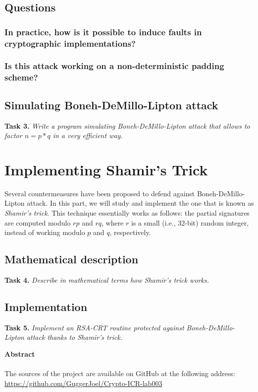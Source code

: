 \documentclass[a4paper]{report}
\begin{document}
\section{Questions}
\subsection{In practice, how is it possible to induce faults in cryptographic implementations?}
\subsection{Is this attack working on a non-deterministic padding scheme?}

\section{Simulating Boneh-DeMillo-Lipton attack}
\textbf{Task 3.} \textit{Write a program simulating Boneh-DeMillo-Lipton attack that allows to factor $n = p*q$ in a very efficient way.}


\chapter{Implementing Shamir’s Trick}
Several countermeasures have been proposed to defend against Boneh-DeMillo-Lipton attack. In this part, we will study and implement the one that is known as \textit{Shamir’s trick}. This technique essentially works as follows: the partial signatures are computed modulo $rp$ and $rq$, where $r$ is a small (i.e., 32-bit) random integer, instead of working modulo $p$ and $q$, respectively.

\section{Mathematical description}
\textbf{Task 4.} \textit{Describe in mathematical terms how Shamir’s trick works.}

\section{Implementation}
\textbf{Task 5.} \textit{Implement an RSA-CRT routine protected against Boneh-DeMillo-Lipton attack thanks to Shamir’s trick.}


\newpage
\vspace*{6 cm}
\begin{center}
\textbf{Abstract} \\
\ \\
The sources of the project are available on GitHub at the following address: \\
\href{https://github.com/GuggerJoel/Crypto-ICR-lab003}{https://github.com/GuggerJoel/Crypto-ICR-lab003}
\end{center}
\end{document}

